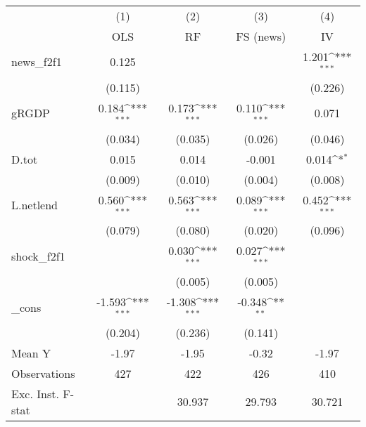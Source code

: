{
\def\sym#1{\ifmmode^{#1}\else\(^{#1}\)\fi}
\begin{tabular}{l*{4}{c}}
\toprule
            &\multicolumn{1}{c}{(1)}&\multicolumn{1}{c}{(2)}&\multicolumn{1}{c}{(3)}&\multicolumn{1}{c}{(4)}\\
            &\multicolumn{1}{c}{OLS}&\multicolumn{1}{c}{RF}&\multicolumn{1}{c}{FS (news)}&\multicolumn{1}{c}{IV}\\
\midrule
news\_f2f1   &       0.125         &                     &                     &       1.201\sym{***}\\
            &     (0.115)         &                     &                     &     (0.226)         \\
\addlinespace
gRGDP       &       0.184\sym{***}&       0.173\sym{***}&       0.110\sym{***}&       0.071         \\
            &     (0.034)         &     (0.035)         &     (0.026)         &     (0.046)         \\
\addlinespace
D.tot       &       0.015         &       0.014         &      -0.001         &       0.014\sym{*}  \\
            &     (0.009)         &     (0.010)         &     (0.004)         &     (0.008)         \\
\addlinespace
L.netlend   &       0.560\sym{***}&       0.563\sym{***}&       0.089\sym{***}&       0.452\sym{***}\\
            &     (0.079)         &     (0.080)         &     (0.020)         &     (0.096)         \\
\addlinespace
shock\_f2f1  &                     &       0.030\sym{***}&       0.027\sym{***}&                     \\
            &                     &     (0.005)         &     (0.005)         &                     \\
\addlinespace
\_cons      &      -1.593\sym{***}&      -1.308\sym{***}&      -0.348\sym{**} &                     \\
            &     (0.204)         &     (0.236)         &     (0.141)         &                     \\
\midrule
Mean Y      &       -1.97         &       -1.95         &       -0.32         &       -1.97         \\
Observations&         427         &         422         &         426         &         410         \\
Exc. Inst. F-stat&                     &      30.937         &      29.793         &      30.721         \\
\bottomrule
\end{tabular}
}
